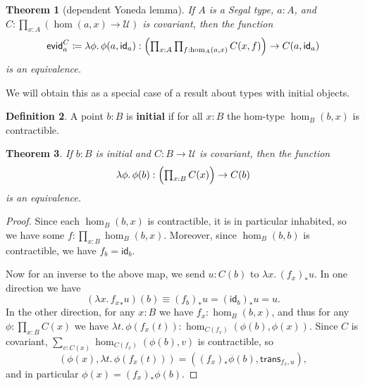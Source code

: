 \documentclass{amsart}
\theoremstyle{plain}
\newtheorem{thm}{Theorem}[section]
\theoremstyle{definition}
\newtheorem{defn}[thm]{Definition}
\theoremstyle{remark}
\numberwithin{equation}{section}
\newcommand{\tprod}{\textstyle\prod}
\newcommand{\jdeq}{\equiv}
\newcommand{\defeq}{\coloneqq}
\newcommand{\univtype}{\mathcal{U}}
\newcommand{\evid}{\mathsf{evid}}
\newcommand{\lam}[1]{\lambda #1.\,}
\newcommand{\idarr}[1]{\mathsf{id}_{#1}}
\newcommand{\covtr}[1]{{#1}_*}  %
\newcommand{\istrans}[2]{\mathsf{trans}_{#1,#2}}
\newcommand{\Parens}[1]{\Bigl(#1\Bigr)}
\begin{document}
\begin{thm}[dependent Yoneda lemma]\label{thm:dep-yoneda}
  If $A$ is a Segal type, $a:A$, and $C:\prod_{x:A} (\hom(a,x)\to \univtype)$ is covariant, then the function
  \[ \evid^C_a \defeq \lam{\phi}\phi(a,\idarr a) : \Parens{\tprod_{x:A} \tprod_{f:\hom_A(a,x)} C(x,f)} \to C(a,\idarr a) \]
  is an equivalence.
\end{thm}

We will obtain this as a special case of a result about types with initial objects.

\begin{defn}
  A point $b:B$ is \textbf{initial} if for all $x:B$ the hom-type $\hom_B(b,x)$ is contractible.
\end{defn}

\begin{thm}\label{thm:initial-yoneda}
  If $b:B$ is initial and $C:B\to \univtype$ is covariant, then the function
  \[ \lam{\phi}{\phi(b)} : \Parens{\tprod_{x:B} C(x)} \to C(b) \]
  is an equivalence.
\end{thm}
\begin{proof}
  Since each $\hom_B(b,x)$ is contractible, it is in particular inhabited, so we have some $f:\tprod_{x:B} \hom_B(b,x)$.
  Moreover, since $\hom_B(b,b)$ is contractible, we have $f_b = \idarr b$.

  Now for an inverse to the above map, we send $u:C(b)$ to $\lam{x} \covtr{(f_x)}{u}$.
  In one direction we have
  \[ (\lam{x} \covtr{f_x}{u})(b) \jdeq \covtr{(f_b)}{u} = \covtr{(\idarr b)}{u} = u.\]
  In the other direction, for any $x:B$ we have $f_x : \hom_B(b,x)$, and thus for any $\phi:\tprod_{x:B} C(x)$ we have $\lam{t} \phi(f_x(t)) : \hom_{C(f_x)}(\phi(b),\phi(x))$.
  Since $C$ is covariant, $\sum_{v:C(x)} \hom_{C(f_x)}(\phi(b),v)$ is contractible, so \[(\phi(x),\lam{t} \phi(f_x(t))) = (\covtr{(f_x)}{\phi(b)},\istrans{f_x}{u}),\] and in particular $\phi(x) = \covtr{(f_x)}{\phi(b)}$.
\end{proof}
\end{document}
